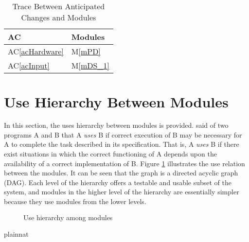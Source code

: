 \documentclass[12pt, titlepage]{article}
\newcommand{\acref}[1]{AC\ref{#1}}
\newcommand{\mref}[1]{M\ref{#1}}
\begin{document}
\begin{table}[H]
  \centering
  \begin{tabular}{p{} p{}}
    \toprule
    \textbf{AC}         & \textbf{Modules}  \\
    \midrule
    \acref{acHardware}  & \mref{mPD}        \\
    \acref{acInput}     & \mref{mDS_1}     \\
    \bottomrule
  \end{tabular}
  \caption{Trace Between Anticipated Changes and Modules}
  \label{TblACT}
\end{table}

\section{Use Hierarchy Between Modules} \label{SecUse}

In this section, the uses hierarchy between modules is
provided. \citet{Parnas1978} said of two programs A and B that A {\em uses} B if
correct execution of B may be necessary for A to complete the task described in
its specification. That is, A {\em uses} B if there exist situations in which
the correct functioning of A depends upon the availability of a correct
implementation of B.  Figure \ref{FigUH} illustrates the use relation between
the modules. It can be seen that the graph is a directed acyclic graph
(DAG). Each level of the hierarchy offers a testable and usable subset of the
system, and modules in the higher level of the hierarchy are essentially simpler
because they use modules from the lower levels.

\begin{figure}[H]
  \centering
  \caption{Use hierarchy among modules}
  \label{FigUH}
\end{figure}


 {plainnat}

\end{document}
